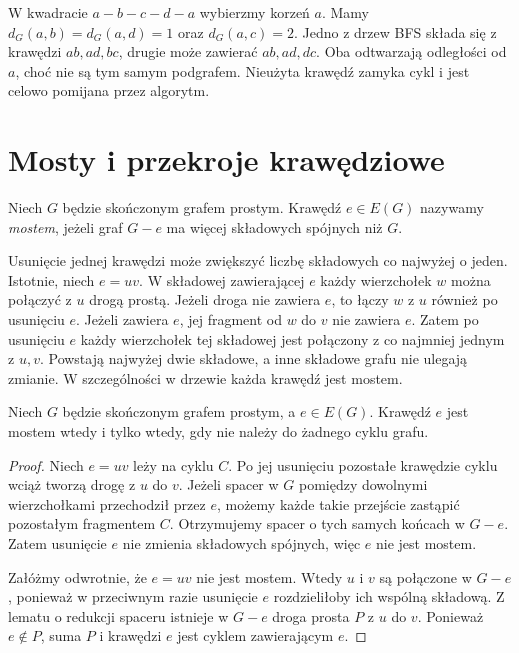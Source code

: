 \begin{przyklad}
W kwadracie $a-b-c-d-a$ wybierzmy korzeń $a$.
Mamy $d_G(a,b)=d_G(a,d)=1$ oraz $d_G(a,c)=2$.
Jedno z drzew BFS składa się z krawędzi
$ab,ad,bc$, drugie może zawierać $ab,ad,dc$.
Oba odtwarzają odległości od $a$, choć
nie są tym samym podgrafem. Nieużyta krawędź
zamyka cykl i jest celowo pomijana przez algorytm.
\end{przyklad}

\section{Mosty i przekroje krawędziowe}
\label{sec:tg-mosty}

\begin{definicja}[Most]
Niech $G$ będzie skończonym grafem prostym.
Krawędź $e\in E(G)$ nazywamy \emph{mostem},
jeżeli graf $G-e$ ma więcej składowych spójnych
niż $G$.
\end{definicja}

Usunięcie jednej krawędzi może zwiększyć liczbę składowych
co najwyżej o jeden. Istotnie, niech $e=uv$.
W składowej zawierającej $e$ każdy wierzchołek $w$
można połączyć z $u$ drogą prostą. Jeżeli droga nie
zawiera $e$, to łączy $w$ z $u$ również po usunięciu
$e$. Jeżeli zawiera $e$, jej fragment od $w$ do $v$
nie zawiera $e$. Zatem po usunięciu $e$ każdy wierzchołek
tej składowej jest połączony z co najmniej jednym z $u,v$.
Powstają najwyżej dwie składowe, a inne składowe grafu
nie ulegają zmianie. W szczególności
w drzewie każda krawędź jest mostem.

\begin{twierdzenie}
Niech $G$ będzie skończonym grafem prostym,
a $e\in E(G)$. Krawędź $e$ jest mostem wtedy
i tylko wtedy, gdy nie należy do żadnego cyklu grafu.
\end{twierdzenie}

\begin{proof}
Niech $e=uv$ leży na cyklu $C$. Po jej
usunięciu pozostałe krawędzie cyklu wciąż
tworzą drogę z $u$ do $v$. Jeżeli spacer
w $G$ pomiędzy dowolnymi wierzchołkami
przechodził przez $e$, możemy każde takie
przejście zastąpić pozostałym fragmentem
$C$. Otrzymujemy spacer o tych samych
końcach w $G-e$. Zatem usunięcie $e$
nie zmienia składowych spójnych, więc $e$
nie jest mostem.

Załóżmy odwrotnie, że $e=uv$ nie jest
mostem. Wtedy $u$ i $v$ są połączone
w $G-e$, ponieważ w przeciwnym razie
usunięcie $e$ rozdzieliłoby ich wspólną
składową. Z lematu o redukcji spaceru
istnieje w $G-e$ droga prosta $P$ z $u$
do $v$. Ponieważ $e\notin P$, suma $P$
i krawędzi $e$ jest cyklem zawierającym $e$.
\end{proof}


